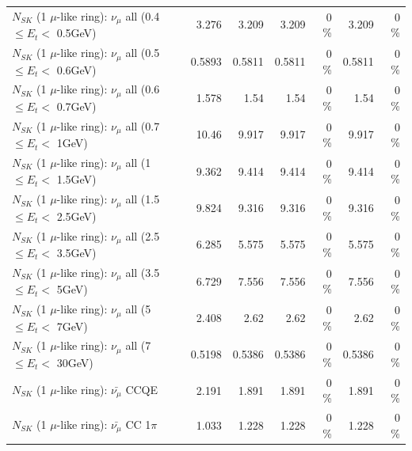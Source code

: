 \begin{table}
\begin{tabular}{| l | r | r | r  r | r  r |}
       $N_{SK}$ (1 $\mu$-like ring): $\nu_{\mu}$ all (0.4 $\leq E_{t} <$ 0.5GeV) &           3.276 &           3.209 &           3.209 &        0 \%  &           3.209 &        0 \%  \\ 
       $N_{SK}$ (1 $\mu$-like ring): $\nu_{\mu}$ all (0.5 $\leq E_{t} <$ 0.6GeV) &          0.5893 &          0.5811 &          0.5811 &        0 \%  &          0.5811 &        0 \%  \\ 
       $N_{SK}$ (1 $\mu$-like ring): $\nu_{\mu}$ all (0.6 $\leq E_{t} <$ 0.7GeV) &           1.578 &            1.54 &            1.54 &        0 \%  &            1.54 &        0 \%  \\ 
         $N_{SK}$ (1 $\mu$-like ring): $\nu_{\mu}$ all (0.7 $\leq E_{t} <$ 1GeV) &           10.46 &           9.917 &           9.917 &        0 \%  &           9.917 &        0 \%  \\ 
         $N_{SK}$ (1 $\mu$-like ring): $\nu_{\mu}$ all (1 $\leq E_{t} <$ 1.5GeV) &           9.362 &           9.414 &           9.414 &        0 \%  &           9.414 &        0 \%  \\ 
       $N_{SK}$ (1 $\mu$-like ring): $\nu_{\mu}$ all (1.5 $\leq E_{t} <$ 2.5GeV) &           9.824 &           9.316 &           9.316 &        0 \%  &           9.316 &        0 \%  \\ 
       $N_{SK}$ (1 $\mu$-like ring): $\nu_{\mu}$ all (2.5 $\leq E_{t} <$ 3.5GeV) &           6.285 &           5.575 &           5.575 &        0 \%  &           5.575 &        0 \%  \\ 
         $N_{SK}$ (1 $\mu$-like ring): $\nu_{\mu}$ all (3.5 $\leq E_{t} <$ 5GeV) &           6.729 &           7.556 &           7.556 &        0 \%  &           7.556 &        0 \%  \\ 
           $N_{SK}$ (1 $\mu$-like ring): $\nu_{\mu}$ all (5 $\leq E_{t} <$ 7GeV) &           2.408 &            2.62 &            2.62 &        0 \%  &            2.62 &        0 \%  \\ 
          $N_{SK}$ (1 $\mu$-like ring): $\nu_{\mu}$ all (7 $\leq E_{t} <$ 30GeV) &          0.5198 &          0.5386 &          0.5386 &        0 \%  &          0.5386 &        0 \%  \\ 
\hline
\hline
\hline
                              $N_{SK}$ (1 $\mu$-like ring): $\bar{\nu_\mu}$ CCQE &           2.191 &           1.891 &           1.891 &        0 \%  &           1.891 &        0 \%  \\ 
                         $N_{SK}$ (1 $\mu$-like ring): $\bar{\nu_\mu}$ CC 1$\pi$ &           1.033 &           1.228 &           1.228 &        0 \%  &           1.228 &        0 \%  \\ 

\end{tabular}
\end{table}
